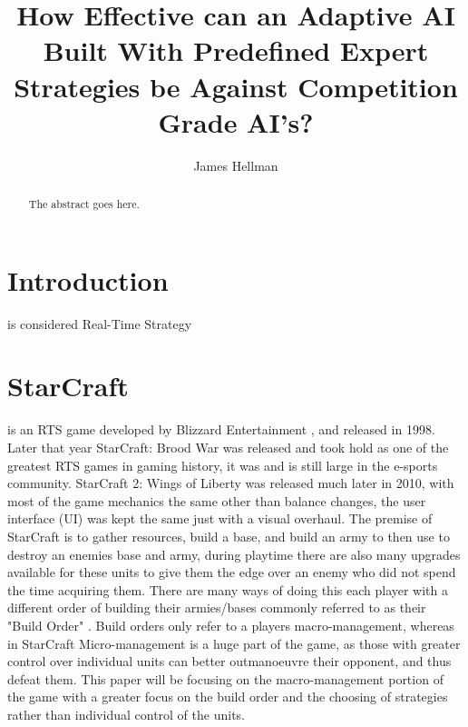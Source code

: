 \documentclass[journal]{IEEEtran}
\begin{document}
%
\title{How Effective can an Adaptive AI Built With Predefined Expert Strategies be Against Competition Grade AI’s?}
%
%
\author{James Hellman}


\maketitle

\begin{abstract}
The abstract goes here.
\end{abstract}

\section{Introduction}
 is considered  \cite{AIBook} \cite{Survey} Real-Time Strategy

\section{StarCraft}
 is an RTS game developed by Blizzard Entertainment \cite{Blizzard}, and released in 1998. Later that year StarCraft: Brood War was released and took hold as one of the greatest RTS games in gaming history, it was and is still large in the e-sports community. StarCraft 2: Wings of Liberty was released much later in 2010, with most of the game mechanics the same other than balance changes, the user interface (UI) was kept the same just with a visual overhaul. The premise of StarCraft is to gather resources, build a base, and build an army to then use to destroy an enemies base and army, during playtime there are also many upgrades available for these units to give them the edge over an enemy who did not spend the time acquiring them. There are many ways of doing this each player with a different order of building their armies/bases commonly referred to as their "Build Order" \cite{BuildOrder}. Build orders only refer to a players macro-management, whereas in StarCraft Micro-management is a huge part of the game, as those with greater control over individual units can better outmanoeuvre their opponent, and thus defeat them. This paper will be focusing on the macro-management portion of the game with a greater focus on the build order and the choosing of strategies rather than individual control of the units.
\end{document}

